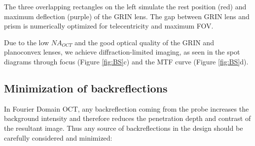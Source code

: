 The three overlapping rectangles on the left simulate the rest position (red) and maximum deflection (purple) of the GRIN lens. The gap between GRIN lens and prism is numerically optimized for telecentricity and maximum FOV.

	Due to the low $\mathit{NA_{OCT}}$ and the good optical quality of the GRIN and planoconvex lenses, we achieve diffraction-limited imaging, as seen in the spot diagrams through focus (Figure \ref{fig:BS}c) and the MTF curve (Figure \ref{fig:BS}d).


\subsection*{Minimization of backreflections}
In Fourier Domain OCT, any backreflection coming from the probe increases the background intensity and therefore reduces the penetration depth and contrast of the resultant image. Thus any source of backreflections in the design should be carefully considered and minimized:

